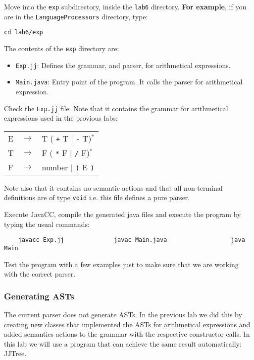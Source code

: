 \documentclass{article}
\begin{document}
Move into the {\tt exp} subdirectory, inside the {\tt lab6} directory. \textbf{For example}, if you are in the {\tt LanguageProcessors} directory, type:
\begin{verbatim}
cd lab6/exp       
\end{verbatim}

The contents of the {\tt exp} directory are:
\begin{itemize}
\item {\tt Exp.jj}: Defines the grammar, and parser, for arithmetical expressions.
\item {\tt Main.java}: Entry point of the program. It calls the parser for arithmetical expression.
\end{itemize}

Check the {\tt Exp.jj} file. Note that it contains the grammar for arithmetical expressions used in the provious labs:

\begin{tabular}{lcl}
E & $\rightarrow$ & T ( \verb-+- T $|$ \verb+-+ T)$^*$ \\
T & $\rightarrow$ & F ( \verb+*+ F $|$ \verb+/+ F)$^*$ \\
F & $\rightarrow$ & number $|$ \verb+(+ E \verb+)+\\
\end{tabular}

 Note also that it contains no semantic actions and that all non-terminal definitions are of type {\tt void} i.e. this file defines a pure parser.

Execute JavaCC, compile the generated java files and execute the program by typing the usual commands:

\begin{verbatim}
    javacc Exp.jj              javac Main.java                  java Main
\end{verbatim}

\noindent Test the program with a few examples just to make sure that we are working with the correct parser.

\subsubsection*{Generating ASTs}

The current parser does not generate ASTs. In the previous lab we did this by creating new classes that implemented the ASTs for arithmetical expressions and added semantics actions to the grammar with the respective constructor calls. In this lab we will use a program that can achieve the same result automatically: JJTree.
\end{document}
